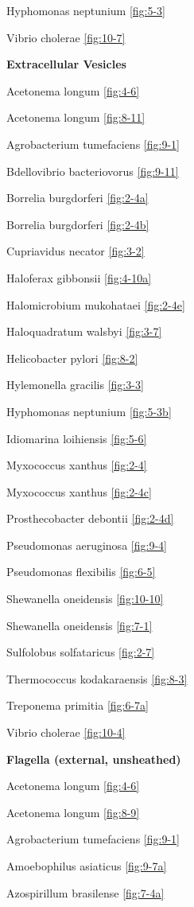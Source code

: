 \documentclass[]{tufte-book}
\begin{document}
Hyphomonas neptunium \ref{fig:5-3}

Vibrio cholerae \ref{fig:10-7}

\textbf{Extracellular Vesicles}

Acetonema longum \ref{fig:4-6}

Acetonema longum \ref{fig:8-11}

Agrobacterium tumefaciens \ref{fig:9-1}

Bdellovibrio bacteriovorus \ref{fig:9-11}

Borrelia burgdorferi \ref{fig:2-4a}

Borrelia burgdorferi \ref{fig:2-4b}

Cupriavidus necator \ref{fig:3-2}

Haloferax gibbonsii \ref{fig:4-10a}

Halomicrobium mukohataei \ref{fig:2-4e}

Haloquadratum walsbyi \ref{fig:3-7}

Helicobacter pylori \ref{fig:8-2}

Hylemonella gracilis \ref{fig:3-3}

Hyphomonas neptunium \ref{fig:5-3b}

Idiomarina loihiensis \ref{fig:5-6}

Myxococcus xanthus \ref{fig:2-4}

Myxococcus xanthus \ref{fig:2-4c}

Prosthecobacter debontii \ref{fig:2-4d}

Pseudomonas aeruginosa \ref{fig:9-4}

Pseudomonas flexibilis \ref{fig:6-5}

Shewanella oneidensis \ref{fig:10-10}

Shewanella oneidensis \ref{fig:7-1}

Sulfolobus solfataricus \ref{fig:2-7}

Thermococcus kodakaraensis \ref{fig:8-3}

Treponema primitia \ref{fig:6-7a}

Vibrio cholerae \ref{fig:10-4}

\textbf{Flagella (external, unsheathed)}

Acetonema longum \ref{fig:4-6}

Acetonema longum \ref{fig:8-9}

Agrobacterium tumefaciens \ref{fig:9-1}

Amoebophilus asiaticus \ref{fig:9-7a}

Azospirillum brasilense \ref{fig:7-4a}
\end{document}
